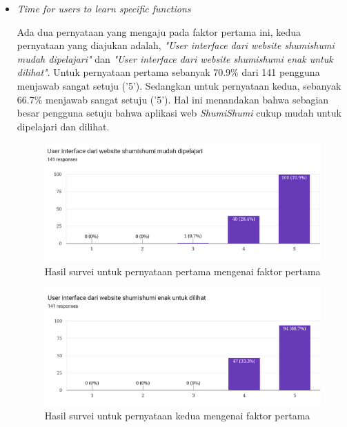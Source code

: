 \documentclass[a4paper]{article}
\begin{document}
\begin{enumerate}
    \begin{itemize}
        \item \textit{Time for users to learn specific functions}
        
        Ada dua pernyataan yang mengaju pada faktor pertama ini, kedua pernyataan yang diajukan adalah, \textit{"User interface dari website shumishumi mudah dipelajari"} dan \textit{"User interface dari website shumishumi enak untuk dilihat"}. Untuk pernyataan pertama sebanyak 70.9\% dari 141 pengguna menjawab sangat setuju ('5'). Sedangkan untuk pernyataan kedua, sebanyak 66.7\% menjawab sangat setuju ('5'). Hal ini menandakan bahwa sebagian besar pengguna setuju bahwa aplikasi web \textit{ShumiShumi} cukup mudah untuk dipelajari dan dilihat.

        \newpage
        \begin{figure}[h]
            \centering
            \includegraphics[scale=0.50]{images/evaluasi ui user 2/Survei 2 - Pertanyaan 4.png}
            \caption{Hasil survei untuk pernyataan pertama mengenai faktor pertama}
        \end{figure}

        \begin{figure}[h]
            \centering
            \includegraphics[scale=0.50]{images/evaluasi ui user 2/Survei 2 - Pertanyaan 6.png}
            \caption{Hasil survei untuk pernyataan kedua mengenai faktor pertama}
        \end{figure}


\end{itemize}
\end{enumerate}
\end{document}
